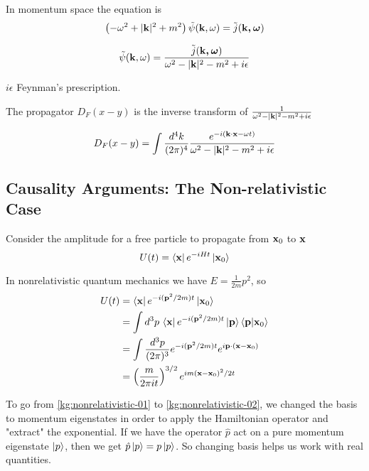 In momentum space the equation is
$$
\left( -\omega^2 + |\boldsymbol{\mathbf{k}}|^2 + m^2 \right) \tilde{\psi}(\boldsymbol{\mathbf{k}}, \omega) = \tilde{j}(\boldsymbol{\mathbf{\boldsymbol{\mathbf{k}}, \omega}})
$$

$$
\tilde{\psi}(\boldsymbol{\mathbf{k}}, \omega) = \frac{ \tilde{j}(\boldsymbol{\mathbf{\boldsymbol{\mathbf{k}}, \omega}}) }{ \omega^2 - |\boldsymbol{\mathbf{k}}|^2 - m^2 + i\epsilon }
$$

$i\epsilon$ Feynman's prescription.

The propagator $D_F(x-y)$ is the inverse transform of
$\frac{ 1 }{ \omega^2 - |\boldsymbol{\mathbf{k}}|^2 - m^2 + i\epsilon }$

$$
D_F(x-y) = \int \frac{d^4k}{(2\pi)^4}
    \frac{ e^{-i(\boldsymbol{\mathbf{k}}\cdot\boldsymbol{\mathbf{x}} -\omega t)} }{ \omega^2 - |\boldsymbol{\mathbf{k}}|^2 - m^2 + i\epsilon }
$$






\subsection{Causality Arguments: The Non-relativistic Case}

Consider the amplitude for a free particle to propagate from $\boldsymbol{\mathbf{x}}_0$ to $\boldsymbol{\mathbf{x}}$
$$
U(t) = \bra{\boldsymbol{\mathbf{x}}} e^{-iHt} \ket{\boldsymbol{\mathbf{x}}_0}
$$

In nonrelativistic quantum mechanics we have $E = \frac{1}{2m} p^2$, so
\begin{align}
U(t) &= \bra{\boldsymbol{\mathbf{x}}} e^{-i(\boldsymbol{\mathbf{p}}^2/2m)t} \ket{\boldsymbol{\mathbf{x}}_0} \label{kg:nonrelativistic-01} \\
&= \int d^3p \, \bra{\boldsymbol{\mathbf{x}}} e^{-i(\boldsymbol{\mathbf{p}}^2/2m)t} \ket{\boldsymbol{\mathbf{p}}} \braket{\boldsymbol{\mathbf{p}} | \boldsymbol{\mathbf{x}}_0} \label{kg:nonrelativistic-02} \\
&= \int \frac{d^3p}{(2\pi)^3} e^{-i(\boldsymbol{\mathbf{p}}^2/2m)t} e^{i\boldsymbol{\mathbf{p}}\cdot(\boldsymbol{\mathbf{x}}-\boldsymbol{\mathbf{x}}_0)} \label{kg:nonrelativistic-03} \\
&= \left( \frac{m}{2\pi i t} \right)^{3/2} e^{im (\boldsymbol{\mathbf{x}}-\boldsymbol{\mathbf{x}}_0)^2 /2t} \label{kg:nonrelativistic-04}
\end{align}


To go from \ref{kg:nonrelativistic-01} to \ref{kg:nonrelativistic-02},
we changed the basis to momentum eigenstates in order to apply the Hamiltonian operator and "extract" the exponential.
If we have the operator $\hat{p}$ act on a pure momentum eigenstate $\ket{p}$, then we get $\hat{p}\ket{p} = p\ket{p}$.
So changing basis helps us work with real quantities.

